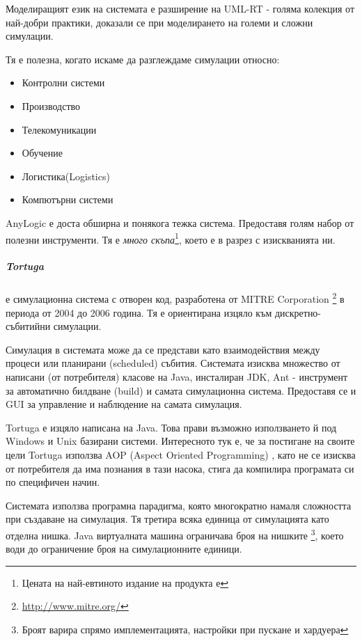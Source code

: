 			Моделиращият език на системата е разширение на UML-RT - голяма колекция от най-добри практики,
			доказали се при моделирането на големи и сложни симулации.
						
			Тя е полезна, когато искаме да разглеждаме симулации относно:
			
			\begin{itemize}
				\item Контролни системи
				\item Производство
				\item Телекомуникации
				\item Обучение
				\item Логистика(Logistics)
				\item Компютърни системи
			\end{itemize}			
			
			AnyLogic е доста обширна и понякога тежка система. Предоставя голям набор от полезни инструменти.
			Тя е \emph{много скъпа}\footnote{Цената на най-евтиното издание на продукта е }, 
			което е в разрез с изискванията ни. \cite{AnyLogic}
			
		\subparagraph{Tortuga} е симулационна система с отворен код, разработена от MITRE Corporation
			\footnote{\url{http://www.mitre.org/}} в периода от 2004 до 2006 година.
			Тя е ориентирана изцяло към дискретно-събитийни симулации.
			
			Симулация в системата може да се представи като взаимодействия между процеси или планирани (scheduled) събития.
			Системата изисква множество от написани (от потребителя) класове на Java, инсталиран \ac{JDK}, 
			Ant - инструмент за автоматично билдване (build) и самата симулационна система. 
			Предоставя се и \ac{GUI} за управление и наблюдение на самата симулация.
					
			Tortuga е изцяло написана на Java. Това прави възможно използването й под Windows и Unix базирани системи.
			Интересното тук е, че за постигане на своите цели Tortuga използва AOP (Aspect Oriented Programming)
			\cite{AOP}, като не се изисква от потребителя да има познания в тази насока, стига да компилира 
			програмата си по специфичен начин. 			
		
			Системата използва програмна парадигма, която многократно намаля сложността при създаване на симулация.
			Тя третира всяка единица от симулацията като отделна нишка. Java виртуалната машина ограничава броя на нишките
			\footnote{Броят варира спрямо имплементацията, настройки при пускане и хардуера}, 
			което води до ограничение броя на симулационните единици.
		
